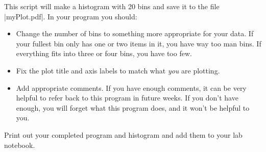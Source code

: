 \documentclass{book}%
\begin{document}
This script will make a histogram with 20 bins and save it to the file |myPlot.pdf|.  In your program you should:
\begin{itemize}
\item Change the number of bins to something more appropriate for your data. If your fullest bin only has one or two items in it, you have way too man bins.  If everything fits into three or four bins, you have too few.  
\item Fix the plot title and axis labels to match what {\em you} are plotting. 
\item Add appropriate comments. If you have enough comments, it can be very helpful to refer back to this program in future weeks.  If you don't have enough, you will forget what this program does, and it won't be helpful to you.
\end{itemize}

Print out your completed program and histogram and add them to your lab notebook.
\end{document}
